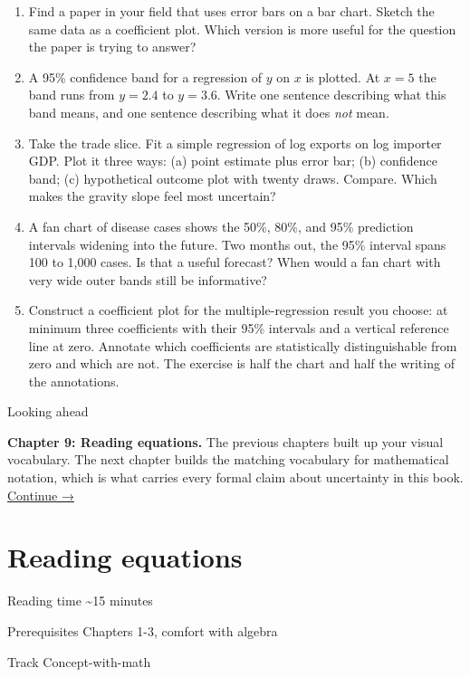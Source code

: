 \documentclass[
  letterpaper,
  11pt,
  twoside,
  openany]{scrbook}
\begin{document}
\begin{enumerate}
\def\labelenumi{\arabic{enumi}.}
\item
  Find a paper in your field that uses error bars on a bar chart. Sketch
  the same data as a coefficient plot. Which version is more useful for
  the question the paper is trying to answer?
\item
  A 95\% confidence band for a regression of \(y\) on \(x\) is plotted.
  At \(x = 5\) the band runs from \(y = 2.4\) to \(y = 3.6\). Write one
  sentence describing what this band means, and one sentence describing
  what it does \emph{not} mean.
\item
  Take the trade slice. Fit a simple regression of log exports on log
  importer GDP. Plot it three ways: (a) point estimate plus error bar;
  (b) confidence band; (c) hypothetical outcome plot with twenty draws.
  Compare. Which makes the gravity slope feel most uncertain?
\item
  A fan chart of disease cases shows the 50\%, 80\%, and 95\% prediction
  intervals widening into the future. Two months out, the 95\% interval
  spans 100 to 1,000 cases. Is that a useful forecast? When would a fan
  chart with very wide outer bands still be informative?
\item
  Construct a coefficient plot for the multiple-regression result you
  choose: at minimum three coefficients with their 95\% intervals and a
  vertical reference line at zero. Annotate which coefficients are
  statistically distinguishable from zero and which are not. The
  exercise is half the chart and half the writing of the annotations.
\end{enumerate}

{Looking ahead}

\textbf{Chapter 9: Reading equations.} The previous chapters built up
your visual vocabulary. The next chapter builds the matching vocabulary
for mathematical notation, which is what carries every formal claim
about uncertainty in this book. \href{09-reading-equations.qmd}{Continue
→}

\chapter{Reading equations}\label{reading-equations}

{Reading time} {\textasciitilde15 minutes}

{Prerequisites} {Chapters 1-3, comfort with algebra}

{Track} {Concept-with-math}
\end{document}
